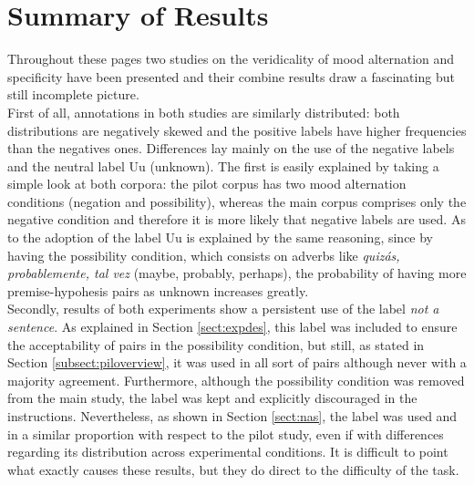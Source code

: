 \label{chap:con}
\section{Summary of Results}
Throughout these pages two studies on the veridicality of mood alternation and specificity have been presented and their combine results draw a fascinating but still incomplete picture.\\

First of all, annotations in both studies are similarly distributed: both distributions are negatively skewed and the positive labels have higher frequencies than the negatives ones. Differences lay mainly on the use of the negative labels and the neutral label Uu (unknown). The first is easily explained by taking a simple look at both corpora: the pilot corpus has two mood alternation conditions (negation and possibility), whereas the main corpus comprises only the negative condition and therefore it is more likely that negative labels are used. As to the adoption of the label Uu is explained by the same reasoning, since by having the possibility condition, which consists on adverbs like \textit{quizás, probablemente, tal vez} (maybe, probably, perhaps), the probability of having more premise-hypohesis pairs as unknown increases greatly.\\

Secondly, results of both experiments show a persistent use of the label \textit{not a sentence}. As explained in Section \ref{sect:expdes}, this label was included to ensure the acceptability of pairs in the possibility condition, but still, as stated in Section \ref{subsect:piloverview}, it was used in all sort of pairs although never with a majority agreement. Furthermore, although the possibility condition was removed from the main study, the label was kept and explicitly discouraged in the instructions. Nevertheless, as shown in Section \ref{sect:nas}, the label was used and in a similar proportion with respect to the pilot study, even if with differences regarding its distribution across experimental conditions. It is difficult to point what exactly causes these results, but they do direct to the difficulty of the task.\\

